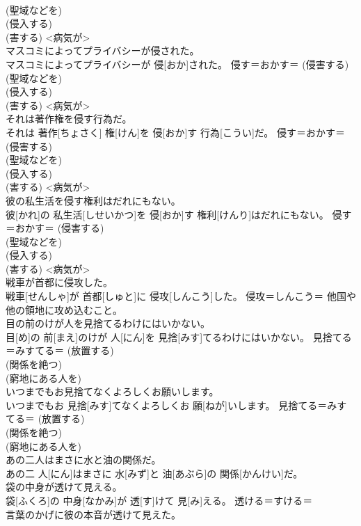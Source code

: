 \documentclass[8pt]{extreport}
\begin{document}
\begin{CJK}{UTF8}{min}
{\\	(聖域などを) 
\\	(侵入する) 
\\	(害する) <病気が> 
\\	マスコミによってプライバシーが侵された。	
\\	マスコミによってプライバシーが 侵[おか]された。	侵す＝おかす＝ (侵害する) 
\\	(聖域などを) 
\\	(侵入する) 
\\	(害する) <病気が> 
\\	それは著作権を侵す行為だ。	
\\	それは 著作[ちょさく] 権[けん]を 侵[おか]す 行為[こうい]だ。	侵す＝おかす＝ (侵害する) 
\\	(聖域などを) 
\\	(侵入する) 
\\	(害する) <病気が> 
\\	彼の私生活を侵す権利はだれにもない。	
\\	彼[かれ]の 私生活[しせいかつ]を 侵[おか]す 権利[けんり]はだれにもない。	侵す＝おかす＝ (侵害する) 
\\	(聖域などを) 
\\	(侵入する) 
\\	(害する) <病気が> 
\\	戦車が首都に侵攻した。	
\\	戦車[せんしゃ]が 首都[しゅと]に 侵攻[しんこう]した。	侵攻＝しんこう＝ 他国や他の領地に攻め込むこと。
\\	目の前のけが人を見捨てるわけにはいかない。	
\\	目[め]の 前[まえ]のけが 人[にん]を 見捨[みす]てるわけにはいかない。	見捨てる＝みすてる＝ (放置する) 
\\	(関係を絶つ) 
\\	(窮地にある人を) 
\\	いつまでもお見捨てなくよろしくお願いします。	
\\	いつまでもお 見捨[みす]てなくよろしくお 願[ねが]いします。	見捨てる＝みすてる＝ (放置する) 
\\	(関係を絶つ) 
\\	(窮地にある人を) 
\\	あの二人はまさに水と油の関係だ。	
\\	あの二 人[にん]はまさに 水[みず]と 油[あぶら]の 関係[かんけい]だ。	
\\	袋の中身が透けて見える。	
\\	袋[ふくろ]の 中身[なかみ]が 透[す]けて 見[み]える。	透ける＝すける＝ 
\\	言葉のかげに彼の本音が透けて見えた。	
}
\end{CJK}
\end{document}
